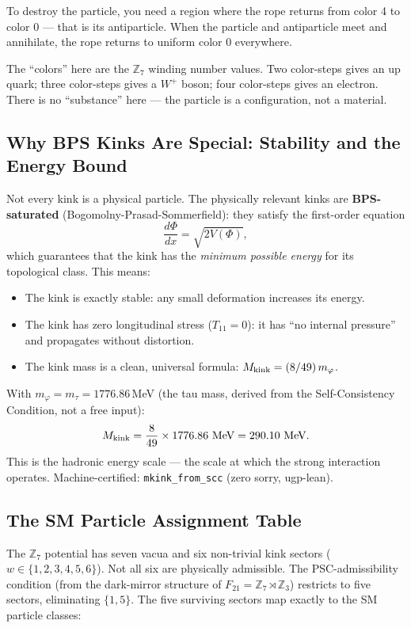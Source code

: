 \documentclass[11pt,a4paper]{article}
\newcommand{\term}[1]{\textbf{#1}}
\newcommand{\lean}[1]{\texttt{#1}}
\newcommand{\ZS}{\mathbb{Z}_7}
\newcommand{\Mkink}{M_{\rm kink}}
\theoremstyle{definition}
\begin{document}
To destroy the particle, you need a region where the rope returns from color 4
to color 0 --- that is its antiparticle.  When the particle and antiparticle
meet and annihilate, the rope returns to uniform color 0 everywhere.

The ``colors'' here are the $\ZS$ winding number values.  Two color-steps
gives an up quark; three color-steps gives a $W^+$ boson; four color-steps
gives an electron.  There is no ``substance'' here --- the particle is a
configuration, not a material.

\subsection{Why BPS Kinks Are Special: Stability and the Energy Bound}

Not every kink is a physical particle.  The physically relevant kinks are
\term{BPS-saturated} (Bogomolny-Prasad-Sommerfield): they satisfy the first-order
equation
\[
  \frac{d\Phi}{dx} = \sqrt{2V(\Phi)},
\]
which guarantees that the kink has the \emph{minimum possible energy} for its
topological class.  This means:
\begin{itemize}
  \item The kink is exactly stable: any small deformation increases its energy.
  \item The kink has zero longitudinal stress ($T_{11} = 0$): it has
    ``no internal pressure'' and propagates without distortion.
  \item The kink mass is a clean, universal formula: $\Mkink = (8/49)\,m_\varphi$.
\end{itemize}

With $m_\varphi = m_\tau = 1776.86$\,MeV (the tau mass, derived from the
Self-Consistency Condition, not a free input):
\[
  \Mkink = \frac{8}{49} \times 1776.86\text{ MeV} = 290.10\text{ MeV}.
\]
This is the hadronic energy scale --- the scale at which the strong interaction
operates.  Machine-certified: \lean{mkink\_from\_scc} (zero sorry, ugp-lean).

\subsection{The SM Particle Assignment Table}

The $\ZS$ potential has seven vacua and six non-trivial kink sectors
($w \in \{1,2,3,4,5,6\}$).  Not all six are physically admissible.
The PSC-admissibility condition (from the dark-mirror structure of
$F_{21} = \ZS \rtimes \mathbb{Z}_3$) restricts to five sectors,
eliminating $\{1,5\}$.
The five surviving sectors map exactly to the SM particle classes:
\end{document}
